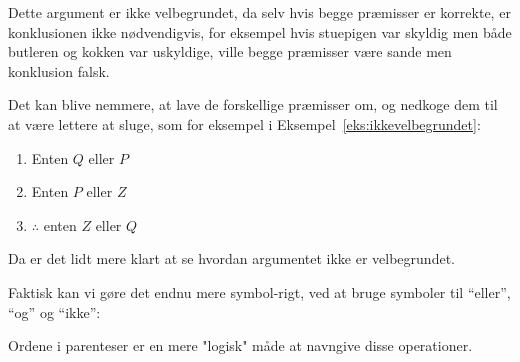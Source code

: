 Dette argument er ikke velbegrundet, da selv hvis begge præmisser er korrekte, er konklusionen ikke nødvendigvis, for eksempel hvis stuepigen var skyldig men både butleren og kokken var uskyldige, ville begge præmisser være sande men konklusion falsk.

Det kan blive nemmere, at lave de forskellige præmisser om, og nedkoge dem til at være lettere at sluge, som for eksempel i Eksempel~\ref{eks:ikkevelbegrundet}:
\begin{center}
  \begin{enumerate}
    \item Enten $Q$ eller $P$
    \item Enten $P$ eller $Z$
    \item $\therefore$ enten $Z$ eller $Q$
  \end{enumerate}
\end{center}
Da er det lidt mere klart at se hvordan argumentet ikke er velbegrundet.

Faktisk kan vi gøre det endnu mere symbol-rigt, ved at bruge symboler til ``eller'', ``og'' og ``ikke'':
\begin{table}[h]
\centering
{}
\end{table}

Ordene i parenteser er en mere "logisk" måde at navngive disse operationer.

